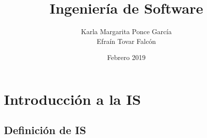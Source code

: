 \documentclass{book}
\title{Ingenier\'ia de Software}
\author{ Karla Margarita Ponce Garc\'ia \\ Efra\'in Tovar Falc\'on }
\date{Febrero 2019}
\begin{document}
\maketitle

\chapter{Introducci\'on a la IS}

\section{Definici\'on de IS}



%

%
\end{document}
